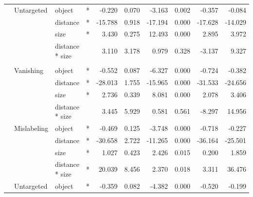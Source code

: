 \begin{longtable}[t]{llllrrrrrr}
\cmidrule{2-10}\nopagebreak
\hspace{1em} & Untargeted & object & * & -0.220 & 0.070 & -3.163 & 0.002 & -0.357 & -0.084\\
\cmidrule{3-10}\nopagebreak
\hspace{1em} &  & distance & * & -15.788 & 0.918 & -17.194 & 0.000 & -17.628 & -14.029\\
\cmidrule{3-10}\nopagebreak
\hspace{1em} &  & size & * & 3.430 & 0.275 & 12.493 & 0.000 & 2.895 & 3.972\\
\cmidrule{3-10}\nopagebreak
\hspace{1em} &  & distance * size &  & 3.110 & 3.178 & 0.979 & 0.328 & -3.137 & 9.327\\
\cmidrule{1-10}\pagebreak[0]
\addlinespace[0.3em]
\multicolumn{10}{l}{\textbf{RetinaNet}}\\
\hspace{1em} & Vanishing & object & * & -0.552 & 0.087 & -6.327 & 0.000 & -0.724 & -0.382\\
\cmidrule{3-10}\nopagebreak
\hspace{1em} &  & distance & * & -28.013 & 1.755 & -15.965 & 0.000 & -31.533 & -24.656\\
\cmidrule{3-10}\nopagebreak
\hspace{1em} &  & size & * & 2.736 & 0.339 & 8.081 & 0.000 & 2.078 & 3.406\\
\cmidrule{3-10}\nopagebreak
\hspace{1em} &  & distance * size &  & 3.445 & 5.929 & 0.581 & 0.561 & -8.297 & 14.956\\
\cmidrule{2-10}\nopagebreak
\hspace{1em} & Mislabeling & object & * & -0.469 & 0.125 & -3.748 & 0.000 & -0.718 & -0.227\\
\cmidrule{3-10}\nopagebreak
\hspace{1em} &  & distance & * & -30.658 & 2.722 & -11.265 & 0.000 & -36.164 & -25.501\\
\cmidrule{3-10}\nopagebreak
\hspace{1em} &  & size & * & 1.027 & 0.423 & 2.426 & 0.015 & 0.200 & 1.859\\
\cmidrule{3-10}\nopagebreak
\hspace{1em} &  & distance * size & * & 20.039 & 8.456 & 2.370 & 0.018 & 3.311 & 36.476\\
\cmidrule{2-10}\nopagebreak
\hspace{1em} & Untargeted & object & * & -0.359 & 0.082 & -4.382 & 0.000 & -0.520 & -0.199\\

\end{longtable}

